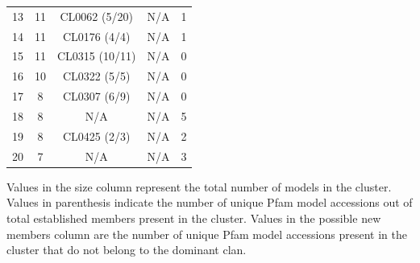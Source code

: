\begin{table}[]
\begin{tabular}{ccccc}
\rowcolor[HTML]{E9EBF5} 
13      & 11   & CL0062 (5/20)                                                                & N/A          & 1                    \\
14      & 11   & CL0176 (4/4)                                                                 & N/A          & 1                    \\
\rowcolor[HTML]{E9EBF5} 
15      & 11   & CL0315 (10/11)                                                               & N/A          & 0                    \\
16      & 10   & CL0322 (5/5)                                                                 & N/A          & 0                    \\
\rowcolor[HTML]{E9EBF5} 
17      & 8    & CL0307 (6/9)                                                                 & N/A          & 0                    \\
18      & 8    & N/A                                                                          & N/A          & 5                    \\
\rowcolor[HTML]{E9EBF5} 
19      & 8    & CL0425 (2/3)                                                                 & N/A          & 2                    \\
20      & 7    & N/A                                                                          & N/A          & 3                   
\end{tabular}
\small
Values in the size column represent the total number of models in the cluster. Values in parenthesis indicate the number of unique Pfam model accessions out of total established members present in the cluster.  Values in the possible new members column are the number of unique Pfam model accessions present in the cluster that do not belong to the dominant clan.
\label{table:clustering}
\end{table}




